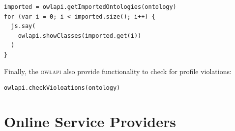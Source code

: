 \documentclass[a5paper, 10pt]{memoir}
\begin{document}
\begin{refsection}
\begin{Verbatim}
imported = owlapi.getImportedOntologies(ontology)
for (var i = 0; i < imported.size(); i++) {
  js.say(
    owlapi.showClasses(imported.get(i))
  )
}
\end{Verbatim}
Finally, the \textsc{owlapi} also provide functionality to check for profile
violations:

\begin{Verbatim}
owlapi.checkVioloations(ontology)
\end{Verbatim}


\printbibliography[heading=subbibliography]
\end{refsection}






\chapter{Online Service Providers}
\end{document}
